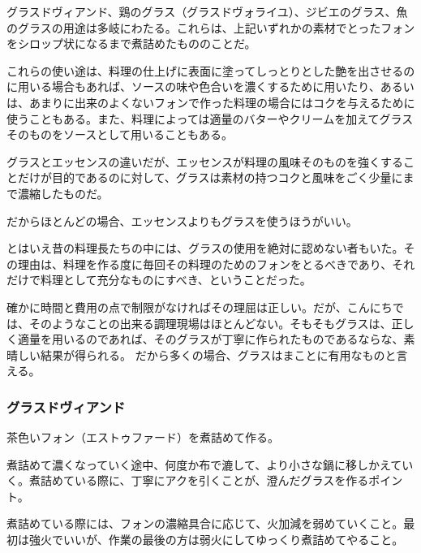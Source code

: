 \begin{recette}


グラスドヴィアンド、鶏のグラス（グラスドヴォライユ）、ジビエのグラス、魚のグラスの用途は多岐にわたる。これらは、上記いずれかの素材でとったフォンをシロップ状になるまで煮詰めたもののことだ。

これらの使い途は、料理の仕上げに表面に塗ってしっとりとした艶を出させるのに用いる場合もあれば、ソースの味や色合いを濃くするために用いたり、あるいは、あまりに出来のよくないフォンで作った料理の場合にはコクを与えるために使うこともある。また、料理によっては適量のバターやクリームを加えてグラスそのものをソースとして用いることもある。

グラスとエッセンスの違いだが、エッセンスが料理の風味そのものを強くすることだけが目的であるのに対して、グラスは素材の持つコクと風味をごく少量にまで濃縮したものだ。

だからほとんどの場合、エッセンスよりもグラスを使うほうがいい。

とはいえ昔の料理長たちの中には、グラスの使用を絶対に認めない者もいた。その理由は、料理を作る度に毎回その料理のためのフォンをとるべきであり、それだけで料理として充分なものにすべき、ということだった。

確かに時間と費用の点で制限がなければその理屈は正しい。だが、こんにちでは、そのようなことの出来る調理現場はほとんどない。そもそもグラスは、正しく適量を用いるのであれば、そのグラスが丁寧に作られたものであるならな、素晴しい結果が得られる。
だから多くの場合、グラスはまことに有用なものと言える。

\hypertarget{glace-de-viande}{%
\subsubsection{グラスドヴィアンド}\label{glace-de-viande}}



茶色いフォン（エストゥファード）を煮詰めて作る。

煮詰めて濃くなっていく途中、何度か布で漉して、より小さな鍋に移しかえていく。煮詰めている際に、丁寧にアクを引くことが、澄んだグラスを作るポイント。

煮詰めている際には、フォンの濃縮具合に応じて、火加減を弱めていくこと。最初は強火でいいが、作業の最後の方は弱火にしてゆっくり煮詰めてやること。


\end{recette}
